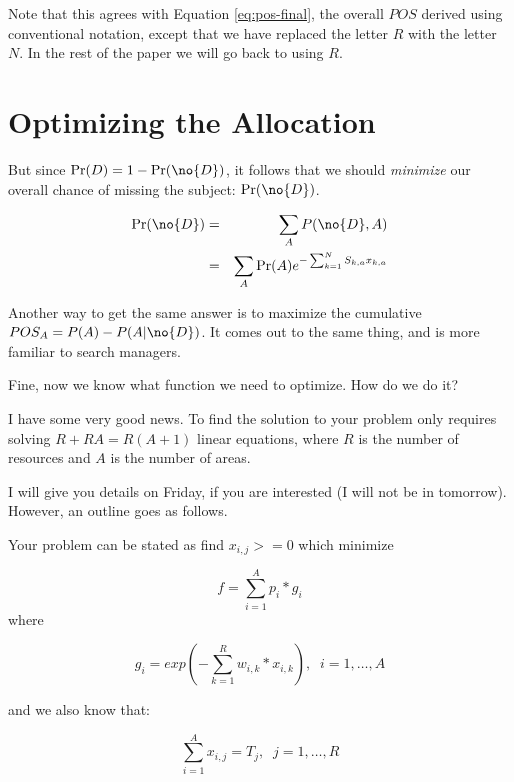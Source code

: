 \documentclass[10pt]{article}
\begin{document}
Note that this agrees with Equation \ref{eq:pos-final}, the overall
$POS$ derived using conventional notation, except that we have
replaced the letter $R$ with the letter $N$. In the rest of the paper
we will go back to using $R$.



\section{Optimizing the Allocation}
\label{sec:Optim-Alloc}


But since $\Pr(D) = 1 - \Pr(\no{D})$, it follows that we
should \emph{minimize} our overall chance of missing the subject:
$\Pr(\no{D})$.

    \begin{eqnarray}
      \label{eq:7}
      \Pr(\no{D}) &=& \sum_A P(\no{D},A)\\
      \nonumber &=& \sum_A \Pr(A) e^{-\sum_{k=1}^N S_{k,a} x_{k,a}}
    \end{eqnarray}

Another way to get the same answer is to maximize the cumulative
$POS_A = P(A) - P(A|\no{D})$. It comes out to the same thing, and is
more familiar to search managers.

Fine, now we know what function we need to optimize. How do we do it?

I have some very good news. To find the solution to your problem only
requires solving $R + RA = R(A+1)$ linear equations, where $R$ is the
number of resources and $A$ is the number of areas.

I will give you details on Friday, if you are interested (I will not be in
tomorrow). However, an outline goes as follows.

Your problem can be stated as find $x_{i,j} >= 0$ which minimize

\begin{equation}
f = \sum_{i=1}^A p_i*g_i
\end{equation}
where

\begin{equation}
  g_i = exp(-\sum_{k=1}^R w_{i,k}*x_{i,k}), \;\; i=1,\ldots,A
\end{equation}

and we also know that:

\begin{equation}
  \sum_{i=1}^A x_{i,j} = T_j, \;\; j=1,\ldots,R   
\end{equation}
\end{document}
